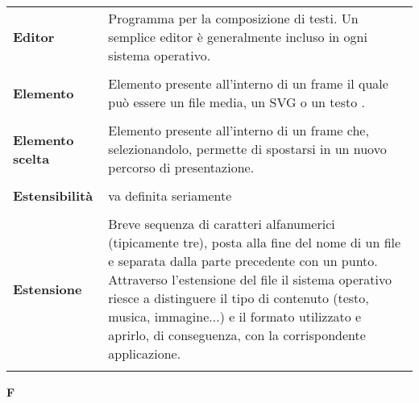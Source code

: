 \begin{longtable}{L{4cm} p{10cm}}
\textbf{Editor} & Programma per la composizione di testi. Un semplice editor è generalmente incluso in ogni sistema operativo. \\ 
 \\ 
\textbf{Elemento} & Elemento presente all'interno di un frame il quale può essere un file media, un SVG o un testo . \\ 
 \\ 
\textbf{Elemento scelta} & Elemento presente all'interno di un frame che, selezionandolo, permette di spostarsi in un nuovo percorso di presentazione. \\ 
 \\ 
\textbf{Estensibilità} & va definita seriamente \\ 
 \\ 
\textbf{Estensione} & Breve sequenza di caratteri alfanumerici (tipicamente tre), posta alla fine del nome di un file e separata dalla parte precedente con un punto. Attraverso l’estensione del file il sistema operativo riesce a distinguere il tipo di contenuto (testo, musica, immagine...) e il formato utilizzato e aprirlo, di conseguenza, con la corrispondente applicazione. \\ 
 \\ 
\end{longtable} 
\newpage 
{} 
{} 
\hfill\Huge{\textbf{F}} \\ 
\normalsize 
